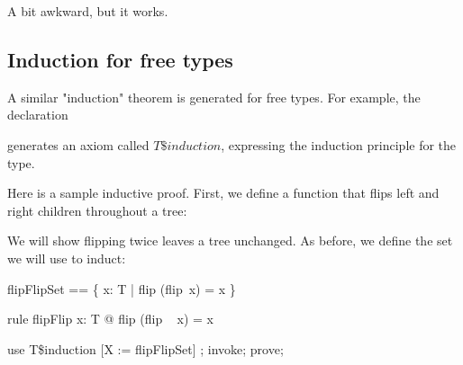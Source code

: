 \documentclass{article}
\begin{document}
A bit awkward, but it works.

\subsection{Induction for free types}

A similar "induction" theorem is generated for free types.  For example,
the declaration


generates an axiom called $T\$induction$, expressing the induction
principle for the type.

Here is a sample inductive proof.  First, we define a function that flips
left and right children throughout a tree:


We will show flipping twice leaves a tree unchanged.
As before, we define the set we will use to induct:

\begin{zed}
  flipFlipSet == \{ x: T | flip (flip~x) = x \}
\end{zed}

\begin{theorem}{rule flipFlip}
  \forall x: T @ flip (flip ~ x) = x
\end{theorem}
\begin{zproof}
use T\$induction [X := flipFlipSet] ;
invoke;
prove;
\end{zproof}
\end{document}
